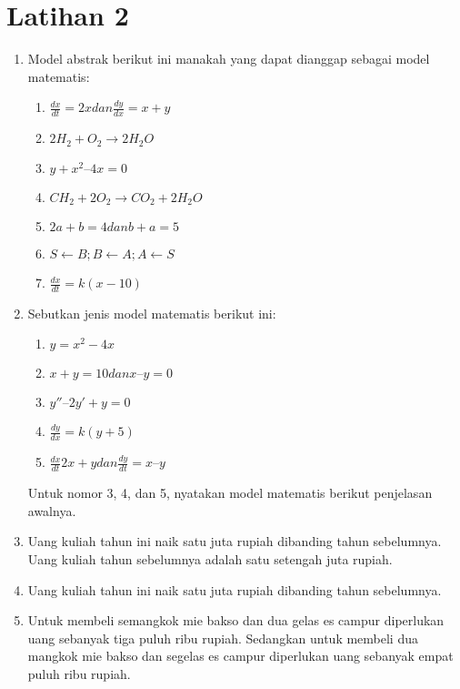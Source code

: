 \documentclass[10pt]{article}
\begin{document}
\section{Latihan 2}
\begin{enumerate}
    \item Model abstrak berikut ini manakah yang dapat dianggap sebagai model
matematis: \begin{enumerate}
    \item $\frac{dx}{dt} = 2x dan \frac{dy}{dx}= x+y$ 
    \item $2H_2+O_2 \rightarrow 2H_2O$
    \item $y+x^2 – 4x= 0$
    \item $CH_2 + 2O_2 \rightarrow CO_2 + 2H_2O$
    \item $ 2a+b=4 dan b+a=5$
    \item $S\leftarrow B ; B \leftarrow A ; A \leftarrow S$
    \item $\frac{dx}{dt}=k(x-10)$
\end{enumerate}
\item Sebutkan jenis model matematis berikut ini:

\begin{enumerate}
    \item $y=x^2-4x$
\item  $x+y=10 dan x – y=0$
\item  $y'' – 2y'+y=0$
\item  $\frac{dy}{dx}=k(y+5)$
\item $\frac{dx}{dt} 2x+y dan \frac{dy}{dt}=x – y$


\end{enumerate}Untuk nomor 3, 4, dan 5, nyatakan model matematis berikut penjelasan
awalnya.
\item Uang kuliah tahun ini naik satu juta rupiah dibanding tahun sebelumnya. Uang kuliah tahun sebelumnya adalah satu setengah juta rupiah.
\item Uang kuliah tahun ini naik satu juta rupiah dibanding tahun sebelumnya.
\item Untuk membeli semangkok mie bakso dan dua gelas es campur
diperlukan uang sebanyak tiga puluh ribu rupiah. Sedangkan untuk
membeli dua mangkok mie bakso dan segelas es campur diperlukan
uang sebanyak empat puluh ribu rupiah. 
\end{enumerate}
\end{document}

